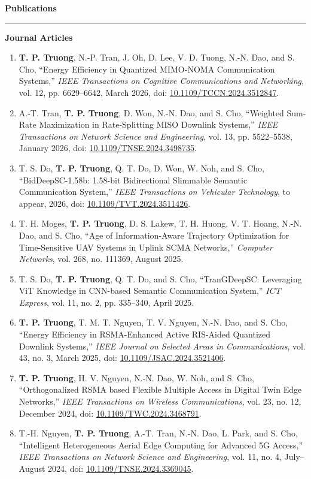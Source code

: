 \documentclass[10pt,letterpaper]{article}
\newcommand{\sectiontitle}[1]{%
  \vspace{0.9em}
  {\large\bfseries #1}\par
  \vspace{0.25em}\hrule\vspace{0.55em}
}
\begin{document}
\sectiontitle{Publications}
\textbf{Journal Articles}
\begin{enumerate}[leftmargin=*, itemsep=0.22em, topsep=0.25em]
  \item \textbf{T. P. Truong}, N.-P. Tran, J. Oh, D. Lee, V. D. Tuong, N.-N. Dao, and S. Cho, ``Energy Efficiency in Quantized MIMO-NOMA Communication Systems,'' \textit{IEEE Transactions on Cognitive Communications and Networking}, vol. 12, pp. 6629--6642, March 2026, doi: \href{https://doi.org/10.1109/TCCN.2024.3512847}{10.1109/TCCN.2024.3512847}.
  \item A.-T. Tran, \textbf{T. P. Truong}, D. Won, N.-N. Dao, and S. Cho, ``Weighted Sum-Rate Maximization in Rate-Splitting MISO Downlink Systems,'' \textit{IEEE Transactions on Network Science and Engineering}, vol. 13, pp. 5522--5538, January 2026, doi: \href{https://doi.org/10.1109/TNSE.2024.3498735}{10.1109/TNSE.2024.3498735}.
  \item T. S. Do, \textbf{T. P. Truong}, Q. T. Do, D. Won, W. Noh, and S. Cho, ``BidDeepSC-1.58b: 1.58-bit Bidirectional Slimmable Semantic Communication System,'' \textit{IEEE Transactions on Vehicular Technology}, to appear, 2026, doi: \href{https://doi.org/10.1109/TVT.2024.3511426}{10.1109/TVT.2024.3511426}.
  \item T. H. Moges, \textbf{T. P. Truong}, D. S. Lakew, T. H. Huong, V. T. Hoang, N.-N. Dao, and S. Cho, ``Age of Information-Aware Trajectory Optimization for Time-Sensitive UAV Systems in Uplink SCMA Networks,'' \textit{Computer Networks}, vol. 268, no. 111369, August 2025.
  \item T. S. Do, \textbf{T. P. Truong}, Q. T. Do, and S. Cho, ``TranGDeepSC: Leveraging ViT Knowledge in CNN-based Semantic Communication System,'' \textit{ICT Express}, vol. 11, no. 2, pp. 335--340, April 2025.
  \item \textbf{T. P. Truong}, T. M. T. Nguyen, T. V. Nguyen, N.-N. Dao, and S. Cho, ``Energy Efficiency in RSMA-Enhanced Active RIS-Aided Quantized Downlink Systems,'' \textit{IEEE Journal on Selected Areas in Communications}, vol. 43, no. 3, March 2025, doi: \href{https://doi.org/10.1109/JSAC.2024.3521406}{10.1109/JSAC.2024.3521406}.
  \item \textbf{T. P. Truong}, H. V. Nguyen, N.-N. Dao, W. Noh, and S. Cho, ``Orthogonalized RSMA based Flexible Multiple Access in Digital Twin Edge Networks,'' \textit{IEEE Transactions on Wireless Communications}, vol. 23, no. 12, December 2024, doi: \href{https://doi.org/10.1109/TWC.2024.3468791}{10.1109/TWC.2024.3468791}.
  \item T.-H. Nguyen, \textbf{T. P. Truong}, A.-T. Tran, N.-N. Dao, L. Park, and S. Cho, ``Intelligent Heterogeneous Aerial Edge Computing for Advanced 5G Access,'' \textit{IEEE Transactions on Network Science and Engineering}, vol. 11, no. 4, July--August 2024, doi: \href{https://doi.org/10.1109/TNSE.2024.3369045}{10.1109/TNSE.2024.3369045}.

\end{enumerate}
\end{document}
